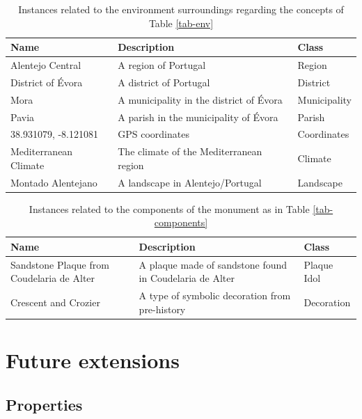 \documentclass[10pt]{report}
\begin{document}
\begin{longtable}{|p{1.5in}|p{3in}|p{1in}|}
    \caption{Instances related to the environment surroundings regarding the concepts of Table \ref{tab-env}}
    \label{tab-inst-env} \\
    \hline
    Name & Description & Class \\
    \hline \hline
    Alentejo Central & A region of Portugal & Region \\
    \hline
    District of Évora & A district of Portugal & District \\
    \hline
    Mora & A municipality in the district of Évora & Municipality \\
    \hline
    Pavia & A parish in the municipality of Évora & Parish \\
    \hline
    38.931079, -8.121081 & GPS coordinates & Coordinates \\
    \hline
    Mediterranean Climate & The climate of the Mediterranean region & Climate \\
    \hline
    Montado Alentejano & A landscape in Alentejo/Portugal & Landscape \\
    \hline
\end{longtable}


\begin{longtable}{|p{1.5in}|p{3in}|p{1in}|}
    \caption{Instances related to the components of the monument as in Table \ref{tab-components}}
    \label{tab-inst-mon} \\
    \hline
    Name & Description & Class \\\hline \hline
       Sandstone Plaque from Coudelaria de Alter & A plaque made of sandstone found in Coudelaria de Alter & Plaque Idol \\
    \hline
    Crescent and Crozier & A type of symbolic decoration from pre-history & Decoration \\
    \hline
    \end{longtable}






\newpage

\section{Future extensions}

\subsection{Properties}
\end{document}
